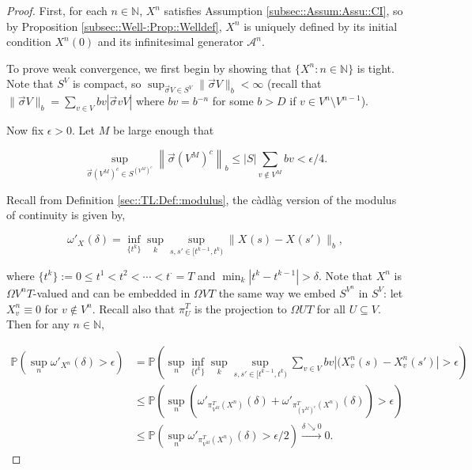 \documentclass[12pt]{article}
\newcommand{\mb}{\mathbb}
\newcommand{\mc}{\mathcal}
\newcommand{\ra}{\rightarrow}
\newcommand{\os}{\overset}
\newcommand{\ep}{\epsilon}
\newcommand{\ind}{\hspace{24pt}}
\newcommand{\pr}{\mb{P}}							%
\renewcommand{\v}{v}							%
\renewcommand{\U}{U}							%
\renewcommand{\S}{S}							%
\newcommand{\s}{\sigma}							%
\newcommand{\sv}{\vec{\s}}						%
\renewcommand{\b}{b}							%
\newcommand{\T}{T}								%
\renewcommand{\t}{t}							%
\renewcommand{\tt}{s}							%
\newcommand{\ttt}{s'}							%
\newcommand{\degr}{D}								%
\newcommand{\IG}{\mc{A}}						%
\newcommand{\pup}[1]{^{#1}}							%
\newcommand{\V}{V}									%
\renewcommand{\it}{k}								%
\newcommand{\numb}{n}								%
\newcommand{\XState}[1]{\S^{#1}}				%
\newcommand{\piV}[2]{\pi_{#1}^{#2}}					%
\newcommand{\rxvt}[2]{X_{#1}{(#2)}}					%
\newcommand{\rxvtn}[3]{X_{#1}^{#3}(#2)}				%
\newcommand{\rxvts}[2]{X_{#1}{#2}}					%
\newcommand{\rxvtsn}[3]{X_{#1}^{#3}{#2}}			%
\begin{document}
\begin{proof}
First, for each \(\numb\in\mb{N}\), \(\rxvtsn{}{}{\numb}\) satisfies Assumption \ref{subsec::Assum:Assu::CI}, so by Proposition \ref{subsec::Well-:Prop::Welldef}, \(\rxvtsn{}{}{\numb}\) is uniquely defined by its initial condition \(\rxvtn{}{0}{\numb}\) and its infinitesimal generator \(\IG\pup{\numb}\).

\ind To prove weak convergence, we first begin by showing that \(\{\rxvtsn{}{}{\numb}:\numb\in \mb{N}\}\) is tight. Note that \(\S^\V\) is compact, so \(\sup_{\sv{}{\V} \in \S^\V} \|\sv{}{\V}\|_{\b{}} < \infty\) (recall that \(\|\sv{}{\V}\|_{\b{}} = \sum_{\v \in \V} \b{\v} |\sv{\v}{\V}|\) where \(\b{\v} = \b{}^{-\numb}\) for some \(\b{} > \degr\) if \(\v \in \V\pup{\numb}\setminus \V\pup{\numb-1}\)).

\ind Now fix \(\ep > 0\). Let \(M\) be large enough that

\[\sup_{\sv{}{\left(\V\pup{M}\right)^c} \in \S^{\left(\V\pup{M}\right)^c}} \left\|\sv{}{\left(\V\pup{M}\right)^c}\right\|_{\b{}} \leq |\S|\sum_{\v \notin \V\pup{M}} \b{\v} < \ep/4.\]

Recall from Definition \ref{sec::TL:Def::modulus}, the c\`adl\`ag version of the modulus of continuity is given by,

\[\omega'_{\rxvts{}{}}(\delta) = \inf_{\{\t\pup{\it}\}} \sup_\it \sup_{\tt,\ttt \in [\t\pup{\it-1},\t\pup{\it})} \|\rxvt{}{\tt} - \rxvt{}{\ttt}\|_{\b{}},\]

where \(\{\t\pup{\it}\} := 0 \leq \t\pup{1} < \t\pup{2} < \cdots < \t\pup{\cdot} = \T\) and \(\min_\it|\t\pup{\it} - \t\pup{\it-1}| > \delta\). Note that \(\rxvtsn{}{}{\numb}\) is \(\Omega{\V\pup{\numb}}{\T}\)-valued and can be embedded in \(\Omega{\V}{\T}\) the same way we embed \(\S^{\V\pup{\numb}}\) in \(\S^\V\): let \(\rxvtsn{\v}{}{\numb} \equiv 0\) for \(\v \notin \V\pup{\numb}\). Recall also that \(\piV{\U}{\T}\) is the projection to \(\Omega{\U}{\T}\) for all \(\U\subseteq \V\). Then for any \(\numb\in \mb{N}\),

\begin{align*}
\pr\left(\sup_\numb \omega'_{\rxvtsn{}{}{\numb}}(\delta) > \epsilon\right) &= \pr\left(\sup_\numb\inf_{\{\t\pup{\it}\}}\sup_\it\sup_{\tt,\ttt \in [\t\pup{\it-1},\t\pup{\it})} \sum_{\v \in \V} \b{\v}|(\rxvtn{\v}{\tt}{\numb} - \rxvtn{\v}{\ttt}{\numb}| > \epsilon \right)\\
&\leq \pr\left(\sup_\numb \left(\omega'_{\piV{\V\pup{M}}{\T}(\rxvtsn{}{}{\numb})}(\delta) + \omega'_{\piV{\left(\V\pup{M}\right)^c}{\T}(\rxvtsn{}{}{\numb})}(\delta)\right) > \ep\right)\\
&\leq \pr\left(\sup_\numb \omega'_{\piV{\V\pup{M}}{\T}(\rxvtsn{}{}{\numb})}(\delta) > \ep/2\right) \os{\delta\searrow 0}{\ra} 0.
\end{align*}


\end{proof}
\end{document}
